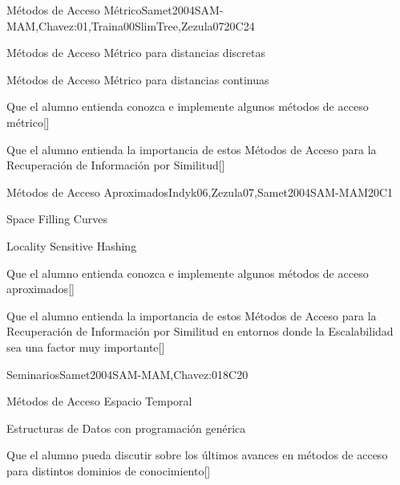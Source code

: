 \begin{syllabus}
\begin{unit}{Métodos de Acceso Métrico}{}{Samet2004SAM-MAM,Chavez:01,Traina00SlimTree,Zezula07}{20}{C24}
   \begin{topics}
         \item Métodos de Acceso Métrico para distancias discretas
         \item Métodos de Acceso Métrico para distancias continuas
   \end{topics}
   \begin{learningoutcomes}
         \item Que el alumno entienda conozca e implemente algunos métodos de acceso métrico[\Usage]
         \item Que el alumno entienda la importancia de estos Métodos de Acceso para la Recuperación de Información por Similitud[\Usage]
   \end{learningoutcomes}
\end{unit}

\begin{unit}{Métodos de Acceso Aproximados}{}{Indyk06,Zezula07,Samet2004SAM-MAM}{20}{C1}
   \begin{topics}
         \item Space Filling Curves
         \item Locality Sensitive Hashing
   \end{topics}
   \begin{learningoutcomes}
         \item Que el alumno entienda conozca e implemente algunos métodos de acceso aproximados[\Usage]
         \item Que el alumno entienda la importancia de estos Métodos de Acceso para la Recuperación de Información por Similitud en entornos donde la Escalabilidad sea una factor muy importante[\Usage]
   \end{learningoutcomes}
\end{unit}

\begin{unit}{Seminarios}{}{Samet2004SAM-MAM,Chavez:01}{8}{C20}
	\begin{topics}
         \item Métodos de Acceso Espacio Temporal
         \item Estructuras de Datos con programación genérica
   \end{topics}
   \begin{learningoutcomes}
         \item Que el alumno pueda discutir sobre los últimos avances en métodos de acceso para distintos dominios de conocimiento[\Usage]
   \end{learningoutcomes}
\end{unit}

\begin{coursebibliography}
\end{coursebibliography}

\end{syllabus}
